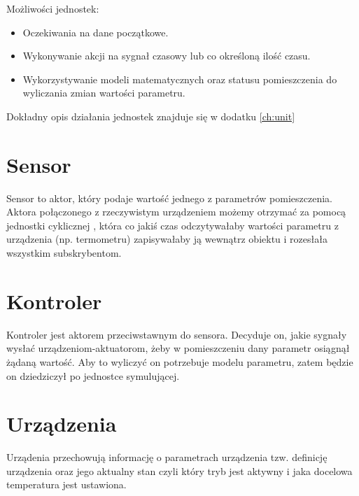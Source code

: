 Możliwości jednostek:
\begin{itemize}
    \item Oczekiwania na dane początkowe.
    \item Wykonywanie akcji na sygnał czasowy lub co określoną ilość czasu.
    \item Wykorzystywanie modeli matematycznych oraz statusu pomieszczenia do wyliczania zmian wartości parametru.
\end{itemize}
Dokładny opis działania jednostek znajduje się w dodatku \ref{ch:unit}

\section{Sensor}
Sensor to aktor, który podaje wartość jednego z parametrów pomieszczenia. Aktora połączonego z rzeczywistym urządzeniem możemy otrzymać za pomocą jednostki cyklicznej , która co jakiś czas odczytywałaby wartości parametru z urządzenia (np. termometru) zapisywałaby ją wewnątrz obiektu i rozesłała wszystkim subskrybentom. 

\section{Kontroler}
Kontroler jest aktorem przeciwstawnym do sensora. Decyduje on, jakie sygnały wysłać urządzeniom-aktuatorom, żeby w pomieszczeniu dany parametr osiągnął żądaną wartość.
Aby to wyliczyć on potrzebuje modelu parametru, zatem będzie on dziedziczył po jednostce symulującej. 

\section{Urządzenia}
Urządenia przechowują informację o parametrach urządzenia tzw. definicję urządzenia oraz jego aktualny stan czyli który tryb jest aktywny i jaka docelowa temperatura jest ustawiona. 
